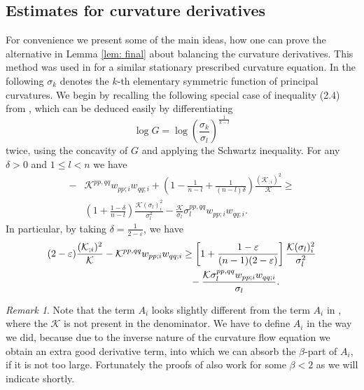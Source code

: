\documentclass{amsart}
\theoremstyle{definition}
\theoremstyle{remark}
\newtheorem{remark}[theorem]{Remark}
\numberwithin{equation}{section}
\begin{document}
\subsection*{Estimates for curvature derivatives}
For convenience we present some of the main ideas, how one can prove the alternative in Lemma \ref{lem: final} about balancing the curvature derivatives. This method was used in \cite{Guan} for a similar stationary prescribed curvature equation.
In the following $\sigma_k$ denotes the $k$-th elementary symmetric function of principal curvatures. We begin by recalling the following special case of inequality (2.4) from \cite[Lemma 2.2]{Guan}, which can be deduced easily by differentiating 
\[\log G=\log \left(\frac{\sigma_k}{\sigma_l}\right)^{\frac{1}{k-l}}\] twice, using the concavity of $G$ and applying the Schwartz inequality.
For any $\delta>0$ and $1\leq l<n$ we have
\begin{align*}
-&\mathcal{K}^{pp,qq}w_{pp;i}w_{qq;i}+\left(1-\frac{1}{n-l}+\frac{1}{(n-l)\delta}\right)\frac{(\mathcal{K}_{;i})^2}{\mathcal{K}}\geq \\
&\left(1+\frac{1-\delta}{n-l}\right)\frac{\mathcal{K}(\sigma_l)_i^2}{\sigma_l^2}-\frac{\mathcal{K}}{\sigma_l}\sigma_l^{pp,qq}w_{pp;i}w_{qq;i}.
\end{align*}
In particular, by taking $\delta=\frac{1}{2-\varepsilon}$, we have
\begin{align}\begin{split}\label{key ineq}
(2-\varepsilon)\frac{(\mathcal{K}_{;i})^2}{\mathcal{K}}-\mathcal{K}^{pp,qq}w_{pp;i}w_{qq;i}&\geq \left[1+\frac{1-\varepsilon}{(n-1)(2-\varepsilon)}\right]\frac{\mathcal{K}(\sigma_l)_i^2}{\sigma_l^2}\\
					&\hphantom{=}-\frac{\mathcal{K}\sigma_l^{pp,qq}w_{pp;i}w_{qq;i}}{\sigma_l}.
\end{split}\end{align}



\begin{remark}
Note that the term $A_i$ looks slightly different from the term $A_i$ in \cite{Guan}, where the $\mathcal{K}$ is not present in the denominator. We have to define $A_i$ in the way we did, because due to the inverse nature of the curvature flow equation we obtain an extra good derivative term, into which we can absorb the $\beta$-part of $A_i$, if it is not too large. Fortunately the proofs of \cite[Lemma~4.2, Lemma~4.3]{Guan} also work for some $\beta<2$ as we will indicate shortly.
\end{remark}
\end{document}
